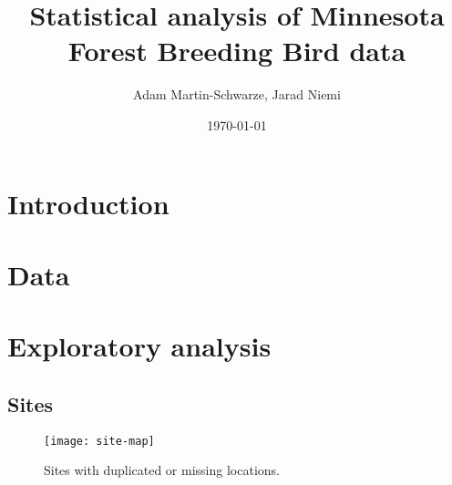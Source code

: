 \documentclass{article}
\title{Statistical analysis of Minnesota Forest Breeding Bird data}
\author{Adam Martin-Schwarze, Jarad Niemi}
\date{\today}
\begin{document}
\maketitle
\tableofcontents
\newpage


\section{Introduction}



\section{Data} 



\section{Exploratory analysis}

\subsection{Sites}





\begin{figure}
\texttt{[image: site-map]}
\caption{Sites with duplicated or missing locations.}
\label{fig:site-map}
\end{figure}
\end{document}
